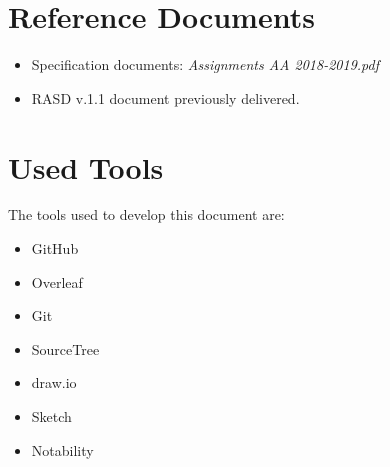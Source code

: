 \section{Reference Documents}
\begin{itemize}

\item Specification documents: \emph{Assignments AA 2018-2019.pdf}
\item RASD v.1.1 document previously delivered.

\end{itemize}

\section{Used Tools}
The tools used to develop this document are:

\begin{itemize}
    \item GitHub
    \item Overleaf
    \item Git
    \item SourceTree
    \item draw.io
    \item Sketch
    \item Notability
\end{itemize}